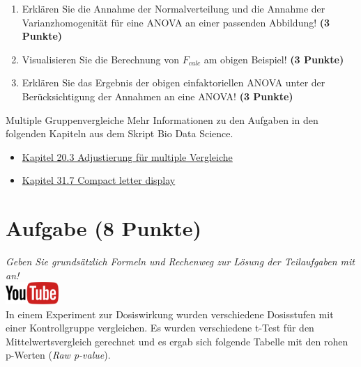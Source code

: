 \documentclass[a4paper, 9pt]{scrartcl}\usepackage[]{graphicx}\usepackage[]{xcolor}
\begin{document}
\begin{enumerate}
\item Erkl{\"a}ren Sie die Annahme der Normalverteilung und die Annahme der
  Varianzhomogenit{\"a}t f{\"u}r eine ANOVA an einer passenden Abbildung! \textbf{(3 Punkte)}
\item Visualisieren Sie die Berechnung von $F_{calc}$ am obigen Beispiel!
  \textbf{(3 Punkte)}
\item Erkl{\"a}ren Sie das Ergebnis der obigen einfaktoriellen ANOVA unter der
  Ber{\"u}cksichtigung der Annahmen an eine ANOVA! \textbf{(3 Punkte)}
\end{enumerate}

 
\clearpage
\begin{graybox}{Multiple Gruppenvergleiche}
Mehr Informationen zu den Aufgaben in den folgenden Kapiteln aus dem Skript Bio Data Science.
  \begin{itemize}
  \item \href{https://jkruppa.github.io/stat-tests-theorie.html}{Kapitel 20.3 Adjustierung für multiple Vergleiche}
  \item \href{https://jkruppa.github.io/stat-tests-posthoc.html}{Kapitel 31.7 Compact letter display}
  \end{itemize}
\end{graybox}
\clearpage

\section{Aufgabe \hfill (8 Punkte)}

\textit{Geben Sie grunds{\"a}tzlich Formeln und Rechenweg zur L{\"o}sung der
  Teilaufgaben mit an!} \\[1Ex]

 \hfill\href{https://youtu.be/hr_jPd1hpKY}{\includegraphics[width =
   2cm]{img/youtube}}\\[1Ex]


In einem Experiment zur Dosiswirkung wurden verschiedene Dosisstufen mit
einer Kontrollgruppe vergleichen. Es wurden verschiedene t-Test f{\"u}r den
Mittelwertsvergleich gerechnet und es ergab sich folgende Tabelle mit den
rohen p-Werten (\textit{Raw p-value}).
\end{document}
